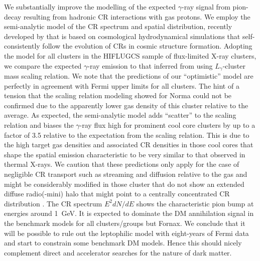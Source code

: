 \documentclass[10pt,aps,pra,reprint,amsmath,amsfonts,amssymb,showpacs]{revtex4-1}
\begin{document}
We substantially improve the modelling of the expected $\gamma$-ray signal from
pion-decay resulting from hadronic CR interactions with gas protons. We employ
the semi-analytic model of the CR spectrum and spatial distribution, recently
developed by \citet{2010MNRAS.409..449P} that is based on cosmological
hydrodynamical simulations that self-consistently follow the evolution of CRs in
cosmic structure formation. Adopting the model for all clusters in the HIFLUGCS
sample of flux-limited X-ray clusters, we compare the expected $\gamma$-ray
emission to that inferred from using $L_\gamma$-cluster mass scaling
relation. We note that the predictions of our ``optimistic'' model are perfectly
in agreement with Fermi upper limits for all clusters.  The hint of a tension
that the scaling relation modeling showed for Norma \citep{2010ApJ...717L..71A}
could not be confirmed due to the apparently lower gas density of this cluster
relative to the average.  As expected, the semi-analytic model adds ``scatter''
to the scaling relation and biases the $\gamma$-ray flux high for prominent cool
core clusters by up to a factor of 3.5 relative to the expectation from the
scaling relation. This is due to the high target gas densities and associated CR
densities in those cool cores that shape the spatial emission characteristic to
be very similar to that observed in thermal X-rays. We caution that these
predictions only apply for the case of negligible CR transport such as streaming
and diffusion relative to the gas and might be considerably modified in those
cluster that do not show an extended diffuse radio(-mini) halo that might point
to a centrally concentrated CR distribution \citep{2011A&A...527A..99E}. The CR
spectrum $E^2 dN/dE$ shows the characteristic pion bump at energies around
1~GeV. It is expected to dominate the DM annihilation signal in the benchmark
models for all clusters/groups but Fornax. We conclude that it will be possible
to rule out the leptophilic model with eight-years of Fermi data and start to
constrain some benchmark DM models. Hence this should nicely complement direct
and accelerator searches for the nature of dark matter.
\end{document}
